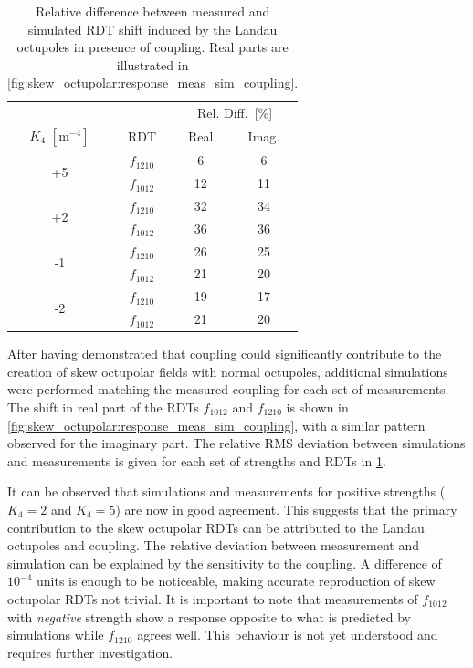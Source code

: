 \FloatBarrier
\subsubsection{}

\begin{table}[!htb]
    \centering
    \begin{tabular}{cccc}
    \toprule
    &&\multicolumn{2}{c}{Rel. Diff. [\%]} \\
    \cmidrule{3-4}
    $K_4$ $[\text{m}^{-4}]$ & RDT & Real & Imag. \\
    \midrule
    \multirow{2}{*}{+5}
     & $f_{1210}$ & 6 & 6  \\
     & $f_{1012}$ & 12  & 11 \\[0.5em]
    \multirow{2}{*}{+2}
     & $f_{1210}$ & 32  & 34  \\
     & $f_{1012}$ & 36  & 36  \\[0.5em]
    \multirow{2}{*}{-1}
     & $f_{1210}$ & 26 & 25 \\
     & $f_{1012}$ & 21 & 20 \\[0.5em]
    \multirow{2}{*}{-2}
     & $f_{1210}$ & 19  & 17  \\
     & $f_{1012}$ & 21 & 20 \\
    \bottomrule
    \end{tabular}
    \caption{Relative difference between measured and simulated RDT shift induced by the
    Landau octupoles in presence of coupling. Real parts are illustrated in
    \cref{fig:skew_octupolar:response_meas_sim_coupling}.}
    \label{tab:skew_octupolar:rms_ratios}
\end{table}

After having demonstrated that coupling could significantly contribute to the creation of skew
octupolar fields with normal octupoles, additional simulations were performed matching the measured
coupling for each set of measurements. The shift in real part of the RDTs $f_{1012}$ and $f_{1210}$
is shown in \cref{fig:skew_octupolar:response_meas_sim_coupling}, with a similar pattern observed
for the imaginary part. The relative RMS deviation between simulations and measurements is given
for each set of strengths and RDTs in \cref{tab:skew_octupolar:rms_ratios}.

It can be observed that simulations and measurements for positive strengths ($K_4=2$ and $K_4=5$) 
are now in good agreement. This suggests that the primary contribution to the skew octupolar RDTs
can be attributed to the Landau octupoles and coupling. The relative deviation between measurement
and simulation can be explained by the sensitivity to the coupling. A difference of $10^{-4}$ units 
is enough to be noticeable, making accurate reproduction of skew octupolar RDTs not trivial.
It is important to note that measurements of $f_{1012}$ with \textit{negative} strength show a
response opposite to what is predicted by simulations while $f_{1210}$ agrees well. This behaviour
is not yet understood and requires further investigation.


